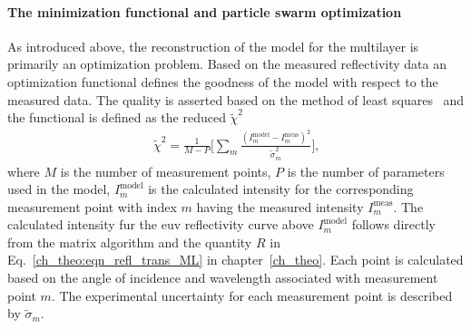 \paragraph{The minimization functional and particle swarm optimization}
As introduced above, the reconstruction of the model for the multilayer is primarily an optimization problem. Based on the measured reflectivity data an optimization functional defines the goodness of the model with respect to the measured data. The quality is asserted based on the method of least squares~\cite{legendre_nouvelles_1805, gauss_theoria_1809, birge_calculation_1932} and the functional is defined as the reduced $\tilde{\chi}^2$
\begin{align}
\tilde{\chi}^2 = \frac{1}{M-P} \bigg[\sum\limits_{m} \frac{(I_m^\text{model} 
- I_m^\text{meas})^2}{\tilde{\sigma}_m^2} \bigg] \text{,} 
\label{ch_spec:eqn_reduced_chi_squared}
\end{align}
where $M$ is the number of measurement points, $P$ is the number of parameters used in the model, $I_m^\text{model}$ is the calculated intensity for the corresponding measurement point with index $m$ having the measured intensity $I_m^\text{meas}$. The calculated intensity fur the \gls{euv} reflectivity curve above $I_m^\text{model}$ follows directly from the matrix algorithm and the quantity $R$ in Eq.~\eqref{ch_theo:eqn_refl_trans_ML} in chapter~\ref{ch_theo}. Each point is calculated based on the angle of incidence and wavelength associated with measurement point $m$. The experimental uncertainty for each measurement point is described by $\tilde{\sigma}_m$.

